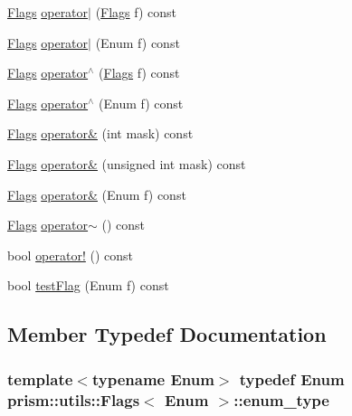 \begin{DoxyCompactItemize}
\item 
\hyperlink{classprism_1_1utils_1_1_flags}{Flags} \hyperlink{classprism_1_1utils_1_1_flags_ab26cc87260ffb1377c61268842233f4c}{operator$\vert$} (\hyperlink{classprism_1_1utils_1_1_flags}{Flags} f) const 
\item 
\hyperlink{classprism_1_1utils_1_1_flags}{Flags} \hyperlink{classprism_1_1utils_1_1_flags_ae7ec359806232516ae304e56c7d1bca0}{operator$\vert$} (Enum f) const 
\item 
\hyperlink{classprism_1_1utils_1_1_flags}{Flags} \hyperlink{classprism_1_1utils_1_1_flags_a5aab9653abe6fed5ed9e172c2fa4358d}{operator$^\wedge$} (\hyperlink{classprism_1_1utils_1_1_flags}{Flags} f) const 
\item 
\hyperlink{classprism_1_1utils_1_1_flags}{Flags} \hyperlink{classprism_1_1utils_1_1_flags_a2c346ecb80fc04db4d5b17992c457591}{operator$^\wedge$} (Enum f) const 
\item 
\hyperlink{classprism_1_1utils_1_1_flags}{Flags} \hyperlink{classprism_1_1utils_1_1_flags_a415ee3884fd6481877d7ceef7ac93fe0}{operator\&} (int mask) const 
\item 
\hyperlink{classprism_1_1utils_1_1_flags}{Flags} \hyperlink{classprism_1_1utils_1_1_flags_a38c4ea30d721dbc1b8fa4629e17898dd}{operator\&} (unsigned int mask) const 
\item 
\hyperlink{classprism_1_1utils_1_1_flags}{Flags} \hyperlink{classprism_1_1utils_1_1_flags_a5c213514567b22fb9693602101f0a006}{operator\&} (Enum f) const 
\item 
\hyperlink{classprism_1_1utils_1_1_flags}{Flags} \hyperlink{classprism_1_1utils_1_1_flags_a49670b087661a316acd4994ee3cd8499}{operator$\sim$} () const 
\item 
bool \hyperlink{classprism_1_1utils_1_1_flags_a73397d689c2e6c77fa01126af1096a5b}{operator!} () const 
\item 
bool \hyperlink{classprism_1_1utils_1_1_flags_abd249b9a27d17cc1a038da073dd735c8}{test\+Flag} (Enum f) const 
\end{DoxyCompactItemize}


\subsection{Member Typedef Documentation}
\subsubsection[{\texorpdfstring{enum\+\_\+type}{enum_type}}]{\setlength{\rightskip}{0pt plus 5cm}template$<$typename Enum$>$ typedef Enum {\bf prism\+::utils\+::\+Flags}$<$ Enum $>$\+::{\bf enum\+\_\+type}}\hypertarget{classprism_1_1utils_1_1_flags_a516bc733417fe76000ad526e1fc525e6}{}\label{classprism_1_1utils_1_1_flags_a516bc733417fe76000ad526e1fc525e6}


